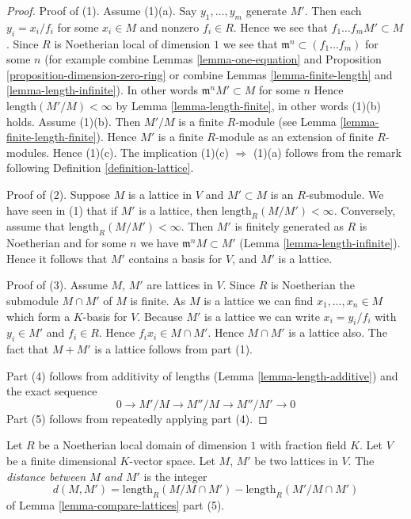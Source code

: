 \begin{proof}
Proof of (1). Assume (1)(a). Say $y_1, \ldots, y_m$ generate $M'$.
Then each $y_i = x_i/f_i$ for some $x_i \in M$ and
nonzero $f_i \in R$.
Hence we see that $f_1 \ldots f_m M' \subset M$.
Since $R$ is Noetherian local of dimension $1$
we see that $\mathfrak m^n \subset (f_1 \ldots f_m)$
for some $n$ (for example combine
Lemmas \ref{lemma-one-equation} and
Proposition \ref{proposition-dimension-zero-ring} or combine
Lemmas \ref{lemma-finite-length} and \ref{lemma-length-infinite}).
In other words $\mathfrak m^nM' \subset M$ for some $n$
Hence
$\text{length}(M'/M) < \infty$ by Lemma \ref{lemma-length-finite},
in other words (1)(b) holds.
Assume (1)(b). Then $M'/M$ is a finite $R$-module
(see Lemma \ref{lemma-finite-length-finite}).
Hence $M'$ is a finite $R$-module as an extension of finite $R$-modules.
Hence (1)(c). The implication
(1)(c) $\Rightarrow$ (1)(a) follows from the remark following
Definition \ref{definition-lattice}.

\medskip\noindent
Proof of (2). Suppose
$M$ is a lattice in $V$ and $M' \subset M$ is an $R$-submodule.
We have seen in (1) that if $M'$ is a lattice, then
$\text{length}_R(M/M') < \infty$. Conversely, assume that
$\text{length}_R(M/M') < \infty$. Then $M'$ is finitely generated
as $R$ is Noetherian and for some $n$ we have
$\mathfrak m^n M \subset M'$ (Lemma \ref{lemma-length-infinite}).
Hence it follows
that $M'$ contains a basis for $V$, and $M'$ is a lattice.

\medskip\noindent
Proof of (3). Assume $M$, $M'$ are lattices in $V$.
Since $R$ is Noetherian the submodule $M \cap M'$ of $M$ is finite.
As $M$ is a lattice we can find
$x_1, \ldots, x_n \in M$ which form a $K$-basis for
$V$. Because $M'$ is a lattice we can write $x_i = y_i/f_i$ with
$y_i \in M'$ and $f_i \in R$. Hence $f_ix_i \in M \cap M'$. Hence
$M \cap M'$ is a lattice also.
The fact that $M + M'$ is a lattice follows from part (1).

\medskip\noindent
Part (4) follows from additivity of lengths
(Lemma \ref{lemma-length-additive})
and the exact sequence
$$
0 \to M'/M \to M''/M \to M''/M' \to 0
$$
Part (5) follows from repeatedly applying part (4).
\end{proof}

\begin{definition}
\label{definition-distance}
Let $R$ be a Noetherian local domain of dimension $1$ with
fraction field $K$. Let $V$ be a finite dimensional $K$-vector space.
Let $M$, $M'$ be two lattices in $V$. The {\it distance between
$M$ and $M'$} is the integer
$$
d(M, M') = \text{length}_R(M/M \cap M') - \text{length}_R(M'/M \cap M')
$$
of Lemma \ref{lemma-compare-lattices} part (5).
\end{definition}

